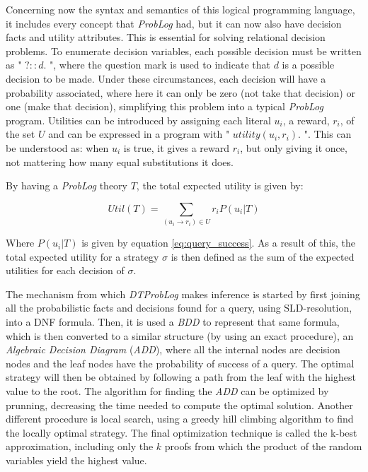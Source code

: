 Concerning now the syntax and semantics of this logical programming language,
it includes every concept that \textit{ProbLog} had, but it can now also have
decision facts and utility attributes. This is essential for solving relational
decision problems. To enumerate decision variables, each possible decision must
be written as " $? :: d.$ ", where the question mark is used to indicate that
$d$ is a possible decision to be made. Under these circumstances, each decision
will have a probability associated, where here it can only be zero (not take
that decision) or one (make that decision), simplifying this problem into a
typical \textit{ProbLog} program. Utilities can be introduced by assigning each
literal $u_i$, a reward, $r_i$, of the set $U$ and can be expressed in a program
with " $utility(u_i, r_i). $ ". This can be understood as: when $u_i$ is true,
it gives a reward $r_i$, but only giving it once, not mattering how many equal
substitutions it does.

By having a \textit{ProbLog} theory $T$, the total expected utility is given by:

\begin{equation}
    Util(T) = \displaystyle\sum_{(u_i \to r_i) \in U} r_iP(u_i|T)
\end{equation}

Where $P(u_i|T)$ is given by equation \ref{eq:query_success}. As a result of
this, the total expected utility for a strategy $\sigma$ is then defined as the
sum of the expected utilities for each decision of $\sigma$.

The mechanism from which \textit{DTProbLog} makes inference is started by first
joining all the probabilistic facts and decisions found for a query, using
SLD-resolution, into a DNF formula. Then, it is used a \textit{BDD} to represent
that same formula, which is then converted to a similar structure (by using an
exact procedure), an \textit{Algebraic Decision Diagram} (\textit{ADD}), where
all the internal nodes are decision nodes and the leaf nodes have the
probability of success of a query. The optimal strategy will then be obtained by
following a path from the leaf with the highest value to the root. The algorithm
for finding the \textit{ADD} can be optimized by prunning, decreasing the time
needed to compute the optimal solution. Another different procedure is local
search, using a greedy hill climbing algorithm to find the locally optimal
strategy. The final optimization technique is called the k-best approximation,
including only the $k$ proofs from which the product of the random variables
yield the highest value.

